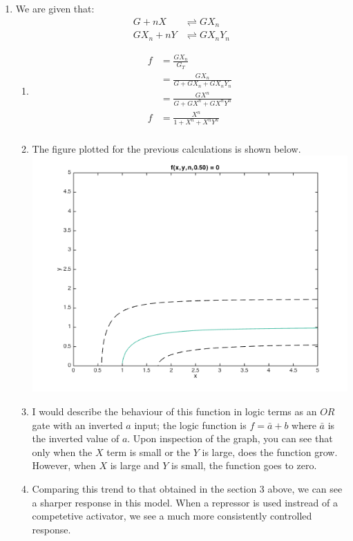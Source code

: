\documentclass[10pt]{article}
\begin{document}
\begin{enumerate}
\item We are given that: \begin{align*} G + nX &\rightleftharpoons GX_n \\ GX_n + nY &\rightleftharpoons GX_nY_n \end{align*}
\begin{enumerate}
\item \begin{align*} f &= \frac {GX_n}{G_T} \\ &= \frac {GX_n}{G + GX_n + GX_nY_n} \\ &= \frac {GX^n}{G + GX^n+GX^nY^n} \\ f &= \frac{X^n}{1 + X^n+X^nY^n} \\ \end{align*}
\item The figure plotted for the previous calculations is shown below.\\ \includegraphics[scale=0.4]{hw11q4b.png}
\item I would describe the behaviour of this function in logic terms as an $OR$ gate with an inverted $a$ input;  the logic function is $f = \bar{a} + b$ where $\bar{a}$ is the inverted value of $a$. Upon inspection of the graph, you can see that only when the $X$ term is small or the $Y$ is large, does the function grow. However, when $X$ is large and $Y$ is small, the function goes to zero.
\item Comparing this trend to that obtained in the section 3 above, we can see a sharper response in this model. When a repressor is used instread of a competetive activator, we see a much more consistently controlled response.
\end{enumerate}



\end{enumerate}
\end{document}

